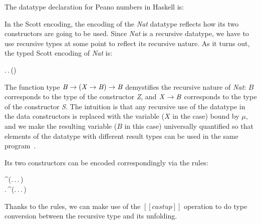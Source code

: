 The datatype declaration for Peano numbers in Haskell is:
\begin{hscode}\SaveRestoreHook
{}%
%
%
\>[4]{}\;\mathrel{=}\mid {}\;\<[E]%
\ColumnHook
\end{hscode}\resethooks
In the Scott encoding, the encoding of the \emph{Nat} datatype
reflects how its two constructors are going to be used. Since
\emph{Nat} is a recursive datatype, we have to use recursive types at
some point to reflect its recursive nature. As it turns out, the typed
Scott encoding of \emph{Nat} is:
\begin{hscode}\SaveRestoreHook
{}%
%
%
\>[3]{}\mu\;\mathbin{:}\star.\,\Pi\;\mathbin{:}\star.\,\to (\to {})\to {}\<[E]%
\ColumnHook
\end{hscode}\resethooks
The function type \ensuremath{\Conid{B}\to (\Conid{X}\to \Conid{B})\to \Conid{B}} demystifies the recursive
nature of \emph{Nat}: $B$ corresponds to the type of the constructor
\emph{Z}, and \ensuremath{\Conid{X}\to \Conid{B}} corresponds to the type of the constructor
\emph{S}. The intuition is that any recursive use of the datatype in
the data constructors is replaced with the variable ($X$ in the case)
bound by $\mu$, and we make the resulting variable ($B$ in this case)
universally quantified so that elements of the datatype with different
result types can be used in the same program~\cite{gadts}.

Its two constructors can be encoded correspondingly via the \cast rules:
\begin{hscode}\SaveRestoreHook
{}%
%
%
\>[3]{}\mathrel{=}^\uparrow{}\;(\lambda {}\mathbin{:}\star.\,\lambda {}\mathbin{:}.\,\lambda {}\mathbin{:}\to {}.\,){}\<[E]%
\\
\>[3]{}\mathrel{=}\lambda {}\mathbin{:}.\,^\uparrow{}\;(\lambda {}\mathbin{:}\star.\,\lambda {}\mathbin{:}.\,\lambda {}\mathbin{:}\to {}.\,\;){}\<[E]%
\ColumnHook
\end{hscode}\resethooks
Thanks to the \cast rules, we can make use of the $[[castup]]$
operation to do type conversion between the recursive type and its
unfolding.

